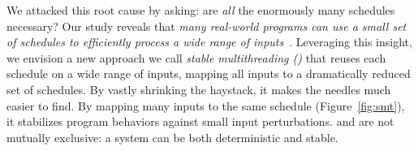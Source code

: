 We attacked this root cause by asking: are \emph{all} the enormously
many schedules necessary?  Our study reveals that \emph{many real-world
  programs can use a small set of schedules to efficiently process a wide
  range of inputs}~\cite{cui:tern:osdi10}.  Leveraging this insight, we
envision a new approach we call \emph{stable multithreading (\smt)}
that reuses each schedule on a wide range of inputs, mapping all inputs to a dramatically
reduced set of schedules. By vastly shrinking the haystack, it makes the
needles much easier to find.  By mapping many inputs to the same schedule (Figure~\ref{fig:smt}),
it stabilizes program behaviors against small input perturbations. 
\smt and \dmt are not mutually exclusive: a system can be both
deterministic and stable.

\begin{figure}[t]
\begin{center}
\vspace{-.05in}

\end{center}
\end{figure}
